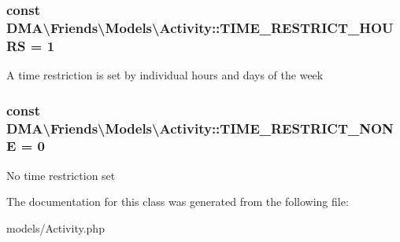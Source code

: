 \subsubsection[{T\+I\+M\+E\+\_\+\+R\+E\+S\+T\+R\+I\+C\+T\+\_\+\+H\+O\+U\+R\+S}]{\setlength{\rightskip}{0pt plus 5cm}const D\+M\+A\textbackslash{}\+Friends\textbackslash{}\+Models\textbackslash{}\+Activity\+::\+T\+I\+M\+E\+\_\+\+R\+E\+S\+T\+R\+I\+C\+T\+\_\+\+H\+O\+U\+R\+S = 1}\label{classDMA_1_1Friends_1_1Models_1_1Activity_ac78040e8784e02c2d1bcce5221ac6cb8}
A time restriction is set by individual hours and days of the week \hypertarget{classDMA_1_1Friends_1_1Models_1_1Activity_ab9dd8b18c4810beabdcf8e45039913c8}{}
\subsubsection[{T\+I\+M\+E\+\_\+\+R\+E\+S\+T\+R\+I\+C\+T\+\_\+\+N\+O\+N\+E}]{\setlength{\rightskip}{0pt plus 5cm}const D\+M\+A\textbackslash{}\+Friends\textbackslash{}\+Models\textbackslash{}\+Activity\+::\+T\+I\+M\+E\+\_\+\+R\+E\+S\+T\+R\+I\+C\+T\+\_\+\+N\+O\+N\+E = 0}\label{classDMA_1_1Friends_1_1Models_1_1Activity_ab9dd8b18c4810beabdcf8e45039913c8}
No time restriction set 

The documentation for this class was generated from the following file\+:\begin{DoxyCompactItemize}
\item 
models/Activity.\+php\end{DoxyCompactItemize}
